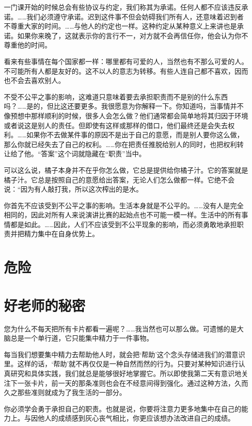 \documentclass[fontset=founder]{ctexart}
\begin{document}
一门课开始的时候总会有些协议与约定，我们称其为承诺。任何人都不应该违反承诺。……我们必须遵守承诺。迟到这件事不但会妨碍我们所有人，还意味着迟到者不尊重大家的时间。……与他人的约定也一样。这种约定从某种意义上来讲也是承诺。如果你来晚了，这就表示你的言行不一，对方就不会再信任你，他会认为你不尊重他的时间。

看来有些事情在每个国家都一样：哪里都有可爱的人，当然也有不那么可爱的人。不可能所有人都是友好的。这不以人的意志为转移。有些人连自己都不喜欢，因而也不会去喜欢别人。

不受不公平之事的影响，这难道只意味着要去承担职责而不是别的什么东西吗？……是的，但比这还要更多。我很愿意为你解释一下。你知道吗，当事情并不像预想中那样顺利的时候，很多人会怎么做？他们通常都会简单地将其归因于环境或者说这是别人的责任。但即使有这样或那样的借口，他们最终还是会失去权利。……如果你不去做某件事的原因不是出于自己的意愿，而是别人要你这么做，那么你就已经失去了自己的权利。……你在把责任推脱给别人的同时，也把权利转让给了他。“答案”这个词就隐藏在“职责”当中。

可以这么说，橘子本身并不在乎你怎么做，它总是提供给你橘子汁。它的答案就是橘子汁。它总是按照自己的意愿给出答案，无论人们怎么做都一样。它绝不会说：“因为有人敲打我，所以这次榨出的是水。

你首先不应该受到不公平之事的影响。生活本身就是不公平的。……没有人是完全相同的，因此对所有人来说演讲比赛的起始点也不可能一模一样。生活中的所有事情都是如此。……因此，人们不应该受到不公平现象的影响，而必须勇敢地承担职责并把精力集中在自身优势上。

\section{危险}

\section{好老师的秘密}

您为什么不每天把所有卡片都看一遍呢？……我当然也可以那么做。可遗憾的是大脑总是一个单行道，它只能集中精力于一件事物。

每当我们想要集中精力去帮助他人时，就会把‘帮助’这个念头存储进我们的潜意识里。这样的话，‘帮助’就不再仅仅是一种自然而然的行为。只要对某种知识进行认真研究和具体实践，我们就总是能够很好地掌握它。所以即使我第二天有意识地关注下一张卡片，前一天的那条准则也会在不经意间得到强化。通过这种方法，久而久之那些准则就成为了我生活的一部分。

你必须学会勇于承担自己的职责。也就是说，你要将注意力更多地集中在自己的能力上。与因他人的成绩感到灰心丧气相比，你更应该想办法改进自己的成绩。
\end{document}
